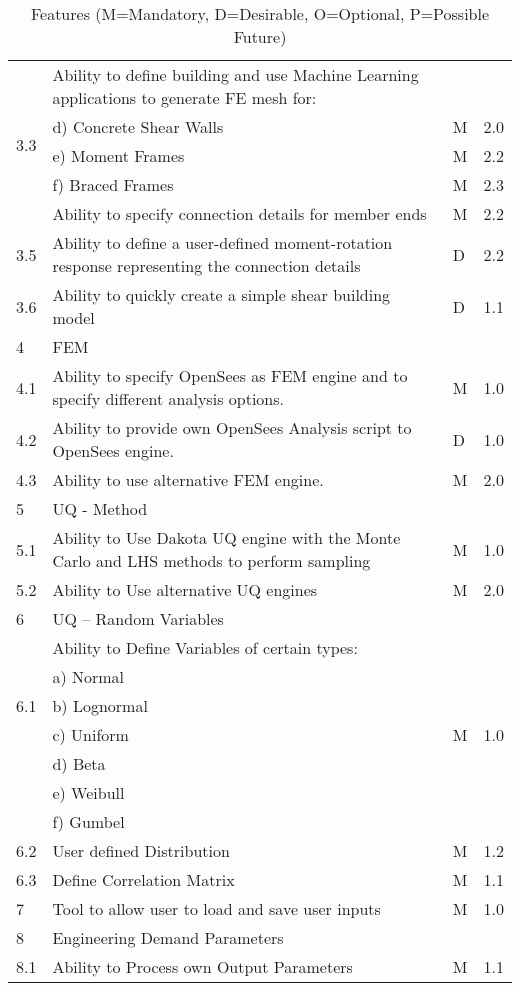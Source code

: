 \begin{table}[hbt!]
\begin{adjustbox}{max width=\textwidth}
\begin{tabular}{llll}
	\multirow{5}{*}{3.3} & Ability to define building and use Machine Learning applications to generate FE mesh for: &  &  \\ 
	 & d)     Concrete Shear Walls & M & 2.0 \\ 
	 & e)     Moment Frames & M & 2.2 \\ 
	 & f)     Braced Frames & M & 2.3  \\ \hline

	3.4 & Ability to specify connection details for member ends & M & 2.2 \\ \hline
	3.5 & Ability to define a user-defined moment-rotation response representing the connection details & D & 2.2 \\ \hline
	3.6 & Ability to quickly create a simple shear building model & D & 1.1 \\ \hline
	4 & FEM &  &  \\ \hline
	4.1 & Ability to specify OpenSees as FEM engine and to specify different analysis options. & M & 1.0 \\ \hline
	4.2 & Ability to provide own OpenSees Analysis script to OpenSees engine. & D & 1.0 \\ \hline
	4.3 & Ability to use alternative FEM engine. & M & 2.0 \\ \hline
	5 & UQ - Method &  &  \\ \hline
	5.1 & Ability to Use Dakota UQ engine with the Monte Carlo and LHS methods to perform sampling & M & 1.0 \\ \hline
	5.2 & Ability to Use alternative UQ engines & M & 2.0 \\ \hline
	6 & UQ – Random Variables &  &  \\ \hline
	\multirow{5}{*}{6.1} & Ability to Define Variables of certain types: &  &  \\ 
	 & a)     Normal &  &  \\ 
	 & b)     Lognormal &  &  \\ 
	 & c)     Uniform & M  & 1.0 \\ 
	 & d)     Beta &  &  \\ 
	 & e)     Weibull &  &  \\ 
	 & f)     Gumbel &  &  \\ \hline
	6.2 & User defined Distribution & M & 1.2 \\ \hline
	6.3 & Define Correlation Matrix & M & 1.1 \\ \hline
	7 & Tool to allow user to load and save user inputs & M & 1.0 \\ \hline
	8 & Engineering Demand Parameters &  &  \\ \hline
	8.1 & Ability to Process own Output Parameters & M & 1.1  \\ \hline
      \bottomrule                                  
  \end{tabular}
\end{adjustbox}
  \caption{Features (M=Mandatory, D=Desirable, O=Optional, P=Possible Future)}             
  \label{tab:features}                 
\end{table}


